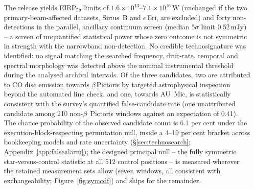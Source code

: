 \documentclass{openjournal}
\begin{document}
The release yields EIRP$_{5\sigma}$ limits of
$1.6\times10^{13}$--$7.1\times10^{16}$\,W (unchanged if the two
primary-beam-affected datasets, Sirius~B and $\epsilon$\,Eri, are
excluded) and forty non-detections in the parallel, ancillary
continuum screen (median $5\sigma$ limit 0.52\,mJy) -- a screen of
unquantified statistical power whose zero outcome is not symmetric in
strength with the narrowband non-detection. No credible
technosignature was identified: no signal matching the searched
frequency, drift-rate, temporal and spectral morphology was detected
above the nominal instrumental threshold during the analysed archival
intervals. Of the three candidates, two are attributed to CO disc
emission towards $\beta$\,Pictoris by targeted astrophysical
inspection beyond the automated line check, and one, towards AU~Mic,
is statistically consistent with the survey's quantified
false-candidate rate (one unattributed candidate among 210
non-$\beta$~Pictoris windows against an expectation of 0.41). The
chance probability of the observed candidate count is 6.1 per cent
under the execution-block-respecting permutation null, inside a
4--19 per cent bracket across bookkeeping models and rate uncertainty
(\S\ref{sec:technosearch}; Appendix~\ref{app:falsealarm}); the
designed principal null -- the fully symmetric star-versus-control
statistic at all 512 control positions -- is measured wherever the
retained measurement sets allow (seven windows, all consistent with
exchangeability; Figure~\ref{fig:symcdf}) and ships for the
remainder.
\end{document}
